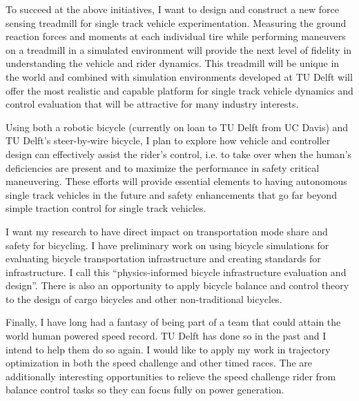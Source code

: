\documentclass{article}
\begin{document}
To succeed at the above initiatives, I want to design and construct a new force
sensing treadmill for single track vehicle experimentation. Measuring the
ground reaction forces and moments at each individual tire while performing
maneuvers on a treadmill in a simulated environment will provide the next level
of fidelity in understanding the vehicle and rider dynamics. This treadmill
will be unique in the world and combined with simulation environments developed
at TU Delft will offer the most realistic and capable platform for single track
vehicle dynamics and control evaluation that will be attractive for many
industry interests.

Using both a robotic bicycle (currently on loan to TU Delft from UC Davis) and
TU Delft's steer-by-wire bicycle, I plan to explore how vehicle and controller
design can effectively assist the rider's control, i.e. to take over when the
human's deficiencies are present and to maximize the performance in safety
critical maneuvering. These efforts will provide essential elements to having
autonomous single track vehicles in the future and safety enhancements that go
far beyond simple traction control for single track vehicles.

I want my research to have direct impact on transportation mode share and
safety for bicycling. I have preliminary work on using bicycle simulations for
evaluating bicycle transportation infrastructure and creating standards for
infrastructure. I call this ``physics-informed bicycle infrastructure
evaluation and design''. There is also an opportunity to apply bicycle balance
and control theory to the design of cargo bicycles and other non-traditional
bicycles.

Finally, I have long had a fantasy of being part of a team that could attain
the world human powered speed record. TU Delft has done so in the past and I
intend to help them do so again. I would like to apply my work in trajectory
optimization in both the speed challenge and other timed races. The are
additionally interesting opportunities to relieve the speed challenge rider
from balance control tasks so they can focus fully on power generation.




\end{document}
